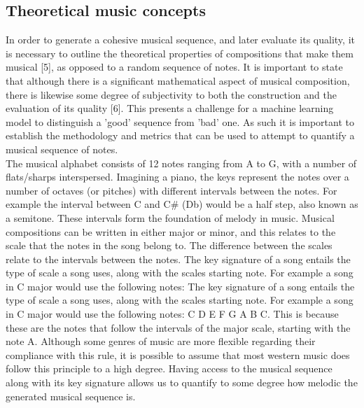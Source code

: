 \documentclass[12pt]{article}
\begin{document}
\subsection*{Theoretical music concepts}
  \begin{flushright}
    \begin{minipage}[t]{0.96\linewidth}
      In order to generate a cohesive musical sequence, and later evaluate its quality, it is necessary to outline the theoretical properties of compositions that make them musical [5], as opposed to a random sequence of notes. It is important to state that although there is a significant mathematical aspect of musical composition, there is likewise some degree of subjectivity to both the construction and the evaluation of its quality [6]. This presents a challenge for a machine learning model to distinguish a 'good' sequence from 'bad' one.  As such it is important to establish the methodology and metrics that can be used to attempt to quantify a musical sequence of notes. \\ The musical alphabet consists of 12 notes ranging from A to G, with a number of flats/sharps interspersed. Imagining a piano, the keys represent the notes over a number of octaves (or pitches) with different intervals between the notes. For example the interval between C and C\# (Db) would be a half step, also known as a semitone. These intervals form the foundation of melody in music. Musical compositions can be written in either major or minor, and this relates to the scale that the notes in the song belong to. The difference between the scales relate to the intervals between the notes.
      \vspace{10pt}
      \noindent{}
      The key signature of a song entails the type of scale a song uses, along with the scales starting note. For example a song in C major would use the following notes:
      \vspace{10pt}
      \noindent{}
      The key signature of a song entails the type of scale a song uses, along with the scales starting note. For example a song in C major would use the following notes: C D E F G A B C. This is because these are the notes that follow the intervals of the major scale, starting with the note A. Although some genres of music are more flexible regarding their compliance with this rule, it is possible to assume that most western music does follow this principle to a high degree. Having access to the musical sequence along with its key signature allows us to quantify to some degree how melodic the generated musical sequence is.
    \end{minipage}
  \end{flushright}
\end{document}
